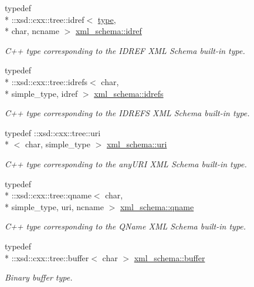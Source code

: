 \begin{DoxyCompactItemize}
typedef \\*
\+::xsd\+::cxx\+::tree\+::idref$<$ \hyperlink{classtype}{type}, \\*
char, ncname $>$ \hyperlink{namespacexml__schema_ac4af625f2450257be84f5475dbfe8fdd}{xml\+\_\+schema\+::idref}
\begin{DoxyCompactList}\small\item\em C++ type corresponding to the I\+D\+R\+E\+F X\+M\+L Schema built-\/in type. \end{DoxyCompactList}\item 
typedef \\*
\+::xsd\+::cxx\+::tree\+::idrefs$<$ char, \\*
simple\+\_\+type, idref $>$ \hyperlink{namespacexml__schema_adb5f7e4c5a09caf31f94ace50b148674}{xml\+\_\+schema\+::idrefs}
\begin{DoxyCompactList}\small\item\em C++ type corresponding to the I\+D\+R\+E\+F\+S X\+M\+L Schema built-\/in type. \end{DoxyCompactList}\item 
typedef \+::xsd\+::cxx\+::tree\+::uri\\*
$<$ char, simple\+\_\+type $>$ \hyperlink{namespacexml__schema_a2518fddf119bd258d7443408863ee457}{xml\+\_\+schema\+::uri}
\begin{DoxyCompactList}\small\item\em C++ type corresponding to the any\+U\+R\+I X\+M\+L Schema built-\/in type. \end{DoxyCompactList}\item 
typedef \\*
\+::xsd\+::cxx\+::tree\+::qname$<$ char, \\*
simple\+\_\+type, uri, ncname $>$ \hyperlink{namespacexml__schema_af47d5d85d1b1714be503513b1c09c079}{xml\+\_\+schema\+::qname}
\begin{DoxyCompactList}\small\item\em C++ type corresponding to the Q\+Name X\+M\+L Schema built-\/in type. \end{DoxyCompactList}\item 
typedef \\*
\+::xsd\+::cxx\+::tree\+::buffer$<$ char $>$ \hyperlink{namespacexml__schema_aff62181c1704f35372302e2acde9b0cc}{xml\+\_\+schema\+::buffer}
\begin{DoxyCompactList}\small\item\em Binary buffer type. \end{DoxyCompactList}\item 

\end{DoxyCompactItemize}
